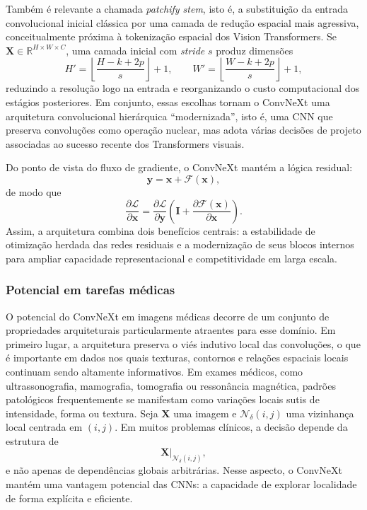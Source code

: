 \documentclass[tcc,capa]{texufpel}
\begin{document}
Também é relevante a chamada \textit{patchify stem}, isto é, a substituição da entrada convolucional inicial clássica por uma camada de redução espacial mais agressiva, conceitualmente próxima à tokenização espacial dos Vision Transformers. Se \(\mathbf{X}\in\mathbb{R}^{H\times W\times C}\), uma camada inicial com \textit{stride} \(s\) produz dimensões
\begin{equation}
	H' = \left\lfloor \frac{H-k+2p}{s}\right\rfloor + 1,
	\qquad
	W' = \left\lfloor \frac{W-k+2p}{s}\right\rfloor + 1,
\end{equation}
reduzindo a resolução logo na entrada e reorganizando o custo computacional dos estágios posteriores. Em conjunto, essas escolhas tornam o ConvNeXt uma arquitetura convolucional hierárquica “modernizada”, isto é, uma CNN que preserva convoluções como operação nuclear, mas adota várias decisões de projeto associadas ao sucesso recente dos Transformers visuais.

Do ponto de vista do fluxo de gradiente, o ConvNeXt mantém a lógica residual:
\begin{equation}
	\mathbf{y} = \mathbf{x} + \mathcal{F}(\mathbf{x}),
\end{equation}
de modo que
\begin{equation}
	\frac{\partial \mathcal{L}}{\partial \mathbf{x}}
	=
	\frac{\partial \mathcal{L}}{\partial \mathbf{y}}
	\left(
	\mathbf{I}
	+
	\frac{\partial \mathcal{F}(\mathbf{x})}{\partial \mathbf{x}}
	\right).
\end{equation}
Assim, a arquitetura combina dois benefícios centrais: a estabilidade de otimização herdada das redes residuais e a modernização de seus blocos internos para ampliar capacidade representacional e competitividade em larga escala.

\subsubsection{Potencial em tarefas médicas}

O potencial do ConvNeXt em imagens médicas decorre de um conjunto de propriedades arquiteturais particularmente atraentes para esse domínio. Em primeiro lugar, a arquitetura preserva o viés indutivo local das convoluções, o que é importante em dados nos quais texturas, contornos e relações espaciais locais continuam sendo altamente informativos. Em exames médicos, como ultrassonografia, mamografia, tomografia ou ressonância magnética, padrões patológicos frequentemente se manifestam como variações locais sutis de intensidade, forma ou textura. Seja \(\mathbf{X}\) uma imagem e \(\mathcal{N}_{\delta}(i,j)\) uma vizinhança local centrada em \((i,j)\). Em muitos problemas clínicos, a decisão depende da estrutura de
\begin{equation}
	\mathbf{X}\vert_{\mathcal{N}_{\delta}(i,j)},
\end{equation}
e não apenas de dependências globais arbitrárias. Nesse aspecto, o ConvNeXt mantém uma vantagem potencial das CNNs: a capacidade de explorar localidade de forma explícita e eficiente.
\end{document}
